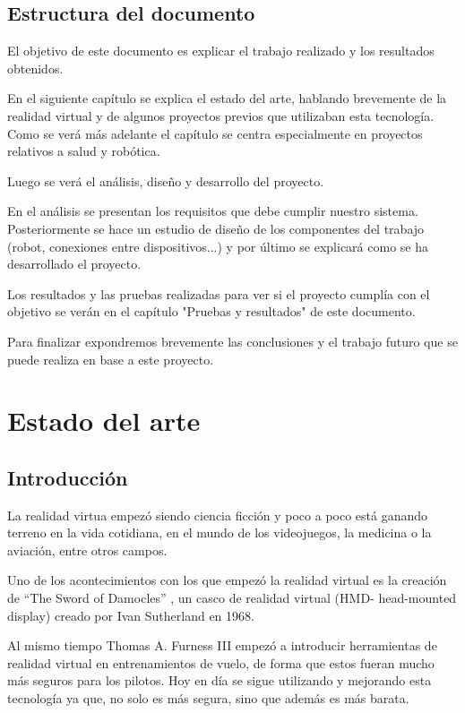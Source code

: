 \documentclass[twoside, 12pt]{epstfg}
\begin{document}
\newpage
\section{Estructura del documento}


El objetivo de este documento es explicar el trabajo realizado y los resultados obtenidos.

En el siguiente capítulo se explica el estado del arte, hablando brevemente de la realidad virtual y de algunos proyectos previos que utilizaban esta tecnología. Como se verá más adelante el capítulo se centra especialmente en proyectos relativos a salud y robótica.

Luego se verá el análisis, diseño y desarrollo del proyecto.

En el análisis se presentan los requisitos que debe cumplir nuestro sistema. Posteriormente se hace un estudio de diseño de los componentes del trabajo (robot, conexiones entre dispositivos...) y por último se explicará como se ha desarrollado el proyecto.

Los resultados y las pruebas realizadas para ver si el proyecto cumplía con el objetivo se verán en el capítulo "Pruebas y resultados" de este documento.

Para finalizar expondremos brevemente las conclusiones y el trabajo futuro que se puede realiza en base a este proyecto.

\chapter{Estado del arte}

\section{Introducción}
La realidad virtua empezó siendo ciencia ficción y poco a poco está ganando terreno en la vida cotidiana, en el mundo de los videojuegos, la medicina o la aviación, entre otros campos.

Uno de los  acontecimientos con los que empezó la realidad virtual es la creación de “The Sword of Damocles” , un casco de realidad virtual (HMD- head-mounted display)  creado por Ivan Sutherland en 1968. 

Al mismo tiempo Thomas A. Furness III empezó a introducir herramientas de realidad virtual en entrenamientos de vuelo, de forma que estos fueran mucho más seguros para los pilotos. Hoy en día se sigue utilizando y mejorando esta tecnología ya que, no solo es más segura, sino que además es más barata.
\end{document}
